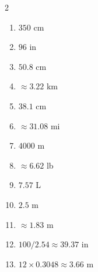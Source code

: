 \documentclass[11pt]{article}
\begin{document}
\begin{keybox}
\begin{multicols}{2}
\small
\begin{enumerate}[leftmargin=*,itemsep=3pt]
  \item $350$ cm
  \item $96$ in
  \item $50.8$ cm
  \item $\approx3.22$ km
  \item $38.1$ cm
  \item $\approx31.08$ mi
  \item $4000$ m
  \item $\approx6.62$ lb
  \item $7.57$ L
  \item $2.5$ m
  \item $\approx1.83$ m
  \item $100/2.54\approx39.37$ in
  \item $12\times0.3048\approx3.66$ m
\end{enumerate}
\end{multicols}
\end{keybox}
\end{document}
